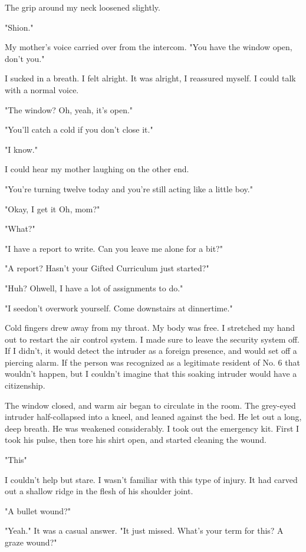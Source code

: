 The grip around my neck loosened slightly.

\myspace

"Shion."

My mother's voice carried over from the intercom. "You have the window
open, don't you."

I sucked in a breath. I felt alright. It was alright, I reassured
myself. I could talk with a normal voice.

"The window? \el Oh, yeah, it's open."

"You'll catch a cold if you don't close it."

"I know."

I could hear my mother laughing on the other end.

"You're turning twelve today and you're still acting like a little boy."

"Okay, I get it \el Oh, mom?"

"What?"

"I have a report to write. Can you leave me alone for a bit?"

"A report? Hasn't your Gifted Curriculum just started?"

"Huh? Oh\el well, I have a lot of assignments to do."

"I see\el don't overwork yourself. Come downstairs at dinnertime."

\myspace

Cold fingers drew away from my throat. My body was free. I stretched my
hand out to restart the air control system. I made sure to leave the
security system off. If I didn't, it would detect the intruder as a
foreign presence, and would set off a piercing alarm. If the person was
recognized as a legitimate resident of No. 6 that wouldn't happen, but I
couldn't imagine that this soaking intruder would have a citizenship.

The window closed, and warm air began to circulate in the room. The
grey-eyed intruder half-collapsed into a kneel, and leaned against the
bed. He let out a long, deep breath. He was weakened considerably. I
took out the emergency kit. First I took his pulse, then tore his shirt
open, and started cleaning the wound.

"This\el "

I couldn't help but stare. I wasn't familiar with this type of injury.
It had carved out a shallow ridge in the flesh of his shoulder joint.

"A bullet wound?"

"Yeah." It was a casual answer. "It just missed. What's your term for
this? A graze wound?"

